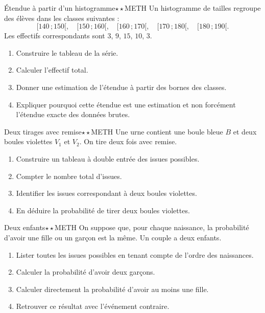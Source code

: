 \documentclass[11pt,a4paper]{article}
\newcommand{\classe}[2]{\ensuremath{[#1\,;#2[}}
\newcounter{exo}
\newcounter{corr}
\begin{document}
\begin{exobox}{Étendue à partir d'un histogramme}{$\star\star$}{METH}
Un histogramme de tailles regroupe des élèves dans les classes suivantes :
\[
\classe{140}{150},\quad \classe{150}{160},\quad \classe{160}{170},\quad \classe{170}{180},\quad \classe{180}{190}.
\]
Les effectifs correspondants sont $3$, $9$, $15$, $10$, $3$.
\begin{enumerate}
\item Construire le tableau de la série.
\item Calculer l'effectif total.
\item Donner une estimation de l'étendue à partir des bornes des classes.
\item Expliquer pourquoi cette étendue est une estimation et non forcément l'étendue exacte des données brutes.
\end{enumerate}
\end{exobox}

\begin{exobox}{Deux tirages avec remise}{$\star\star$}{METH}
Une urne contient une boule bleue $B$ et deux boules violettes $V_1$ et $V_2$. On tire deux fois avec remise.
\begin{enumerate}
\item Construire un tableau à double entrée des issues possibles.
\item Compter le nombre total d'issues.
\item Identifier les issues correspondant à deux boules violettes.
\item En déduire la probabilité de tirer deux boules violettes.
\end{enumerate}
\end{exobox}

\begin{exobox}{Deux enfants}{$\star\star$}{METH}
On suppose que, pour chaque naissance, la probabilité d'avoir une fille ou un garçon est la même. Un couple a deux enfants.
\begin{enumerate}
\item Lister toutes les issues possibles en tenant compte de l'ordre des naissances.
\item Calculer la probabilité d'avoir deux garçons.
\item Calculer directement la probabilité d'avoir au moins une fille.
\item Retrouver ce résultat avec l'événement contraire.
\end{enumerate}
\end{exobox}
\end{document}
